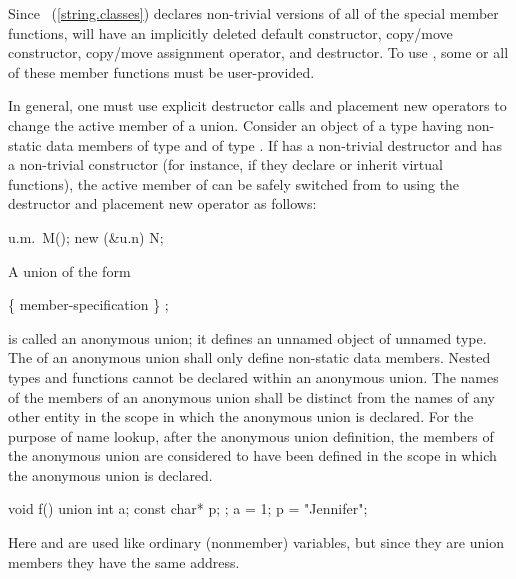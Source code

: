 Since ~(\ref{string.classes}) declares non-trivial versions of all of the special
member functions,  will have an implicitly deleted default constructor,
copy/move constructor,
copy/move assignment operator, and destructor.
To use , some or all of these member functions
must be user-provided.\exitexample

\pnum
\enternote In general, one must use explicit destructor calls and placement
new operators to change the active member of a union. \exitnote
\enterexample
Consider an object  of a  type  having non-static data members
 of type  and  of type . If  has a non-trivial
destructor and  has a non-trivial constructor (for instance, if they declare or inherit
virtual functions), the active member of  can be safely switched from  to
 using the destructor and placement new operator as follows:

\begin{codeblock}
u.m.~M();
new (&u.n) N;
\end{codeblock}
\exitexample

\pnum
{}%
A union of the form

\begin{ncbnftab}
 \{ member-specification \} ;
\end{ncbnftab}

is called an anonymous union; it defines an unnamed object of unnamed
type. The  of an anonymous union shall
only define non-static data members.
\enternote
Nested types and functions cannot be declared within an anonymous union.
\exitnote
The names of the members of an anonymous union shall be distinct from
the names of any other entity in the scope in which the anonymous union
is declared. For the purpose of name lookup, after the anonymous union
definition, the members of the anonymous union are considered to have
been defined in the scope in which the anonymous union is declared.
%
\enterexample

\begin{codeblock}
void f() {
  union { int a; const char* p; };
  a = 1;
  p = "Jennifer";
}
\end{codeblock}

Here  and  are used like ordinary (nonmember)
variables, but since they are union members they have the same address.
\exitexample

